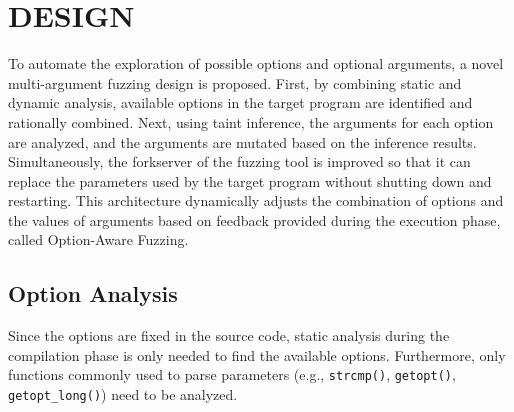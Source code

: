 \section{DESIGN}
\label{ch:design}

To automate the exploration of possible options and optional arguments, a novel multi-argument fuzzing design is proposed. First, by combining static and dynamic analysis, available options in the target program are identified and rationally combined.
Next, using taint inference, the arguments for each option are analyzed, and the arguments are mutated based on the inference results.
Simultaneously, the forkserver of the fuzzing tool is improved so that it can replace the parameters used by the target program without shutting down and restarting.
This architecture dynamically adjusts the combination of options and the values of arguments based on feedback provided during the execution phase, called Option-Aware Fuzzing.

\subsection{Option Analysis} %

Since the options are fixed in the source code, static analysis during the compilation phase is only needed to find the available options. Furthermore, only functions commonly used to parse parameters (e.g., \texttt{strcmp()}, \texttt{getopt()}, \texttt{getopt\_long()}) need to be analyzed.


